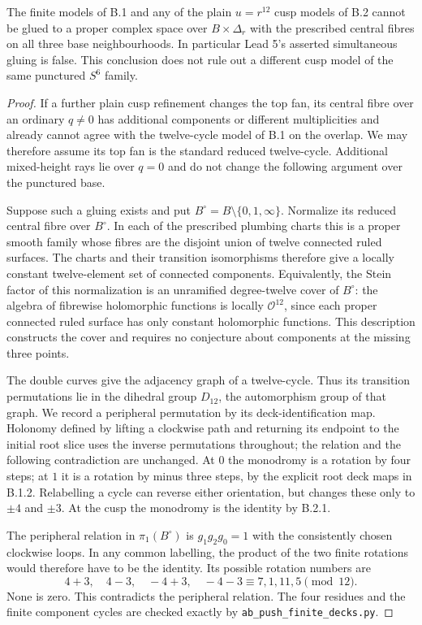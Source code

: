 \begin{theorem}\label{push:B31}
The finite models of B.1 and any of the plain
$u=r^{12}$ cusp models of B.2 cannot be glued to a
proper complex space over $B\times\Delta_r$ with
the prescribed central fibres on all three base
neighbourhoods. In particular Lead 5's asserted
simultaneous gluing is false. This conclusion does
not rule out a different cusp model of the same
punctured $S^6$ family.
\end{theorem}
\begin{proof}
If a further plain cusp refinement changes the top fan,
its central fibre over an ordinary $q\ne0$ has additional
components or different multiplicities and already cannot
agree with the twelve-cycle model of B.1 on the overlap.
We may therefore assume its top fan is the standard reduced
twelve-cycle. Additional mixed-height rays lie over $q=0$
and do not change the following argument over the punctured
base.

Suppose such a gluing exists and put
$B^\circ=B\setminus\{0,1,\infty\}$. Normalize
its reduced central fibre over $B^\circ$. In
each of the prescribed plumbing charts this is
a proper smooth family whose fibres are the
disjoint union of twelve connected ruled
surfaces. The charts and their transition
isomorphisms therefore give a locally constant
twelve-element set of connected components.
Equivalently, the Stein factor of this
normalization is an unramified degree-twelve
cover of $B^\circ$: the algebra of fibrewise
holomorphic functions is locally $\mathcal O^{12}$,
since each proper connected ruled surface has
only constant holomorphic functions. This
description constructs the cover and requires
no conjecture about components at the missing
three points.

The double curves give the adjacency graph of
a twelve-cycle. Thus its transition
permutations lie in the dihedral group
$D_{12}$, the automorphism group of that graph.
We record a peripheral permutation by its
deck-identification map. Holonomy defined by
lifting a clockwise path and returning its
endpoint to the initial root slice uses the
inverse permutations throughout; the relation
and the following contradiction are unchanged.
At $0$ the monodromy is a rotation by four
steps; at $1$ it is a rotation by minus three
steps, by the explicit root deck maps in
B.1.2. Relabelling a cycle can reverse either
orientation, but changes these only to
$\pm4$ and $\pm3$. At the cusp the
monodromy is the identity by B.2.1.

The peripheral relation in
$\pi_1(B^\circ)$ is $g_1g_2g_0=1$ with
the consistently chosen clockwise loops.
In any common labelling, the product of the
two finite rotations would therefore have
to be the identity. Its possible rotation
numbers are
\[
 4+3,\quad4-3,\quad-4+3,\quad-4-3
 \equiv7,1,11,5\pmod {12}.
\]
None is zero. This contradicts the peripheral
relation. The four residues and the finite
component cycles are checked exactly by
\texttt{ab\_push\_finite\_decks.py}.
\end{proof}

